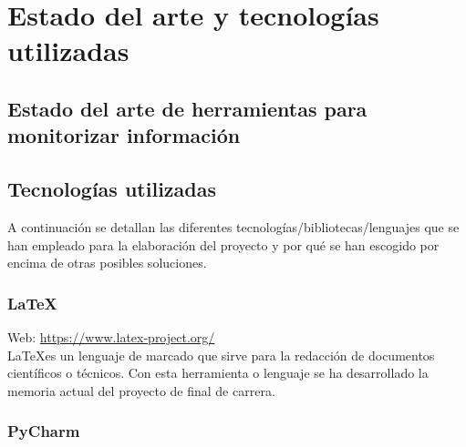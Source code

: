 \chapter[Estado del arte y tecnologías utilizadas]{Estado del arte y tecnologías utilizadas}
\label{chap:estado del arte}

\section[Estado del arte de herramientas para monitorizar información]{Estado del arte de herramientas para monitorizar información}





\section{Tecnologías utilizadas}

A continuación se detallan las diferentes tecnologías/bibliotecas/lenguajes que se han empleado para la elaboración del proyecto y por qué se han escogido por encima de otras posibles soluciones.


\subsection{\LaTeX}

Web: \url{https://www.latex-project.org/}\\

\LaTeX es un lenguaje de marcado que sirve para la redacción de documentos científicos o técnicos. Con esta herramienta o lenguaje se ha desarrollado la memoria actual del proyecto de final de carrera.



\subsection{PyCharm}


